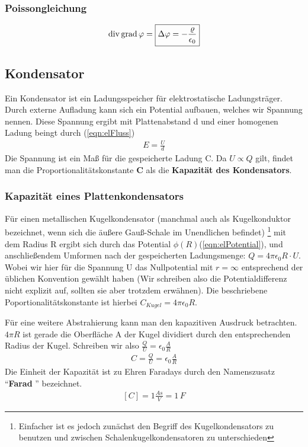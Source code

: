 \subsubsection{Poissongleichung}\begin{align}\label{eqn:Poissongleichung}
\mathrm{div\,} \mathrm{grad\,} \varphi = \boxed{\Delta \varphi = -\frac{\varrho}{\epsilon_0}}
\end{align}
\subsection{Kondensator}
Ein Kondensator ist ein Ladungsspeicher für elektrostatische Ladungsträger.
Durch externe Aufladung kann sich ein Potential aufbauen, welches wir Spannung nennen.
Diese Spannung ergibt mit  Plattenabstand d und einer homogenen Ladung beingt durch (\ref{eqn:elFluss})\begin{align}
E = \frac{U}{d}
\end{align}Die Spannung ist ein Maß für die gespeicherte Ladung C. Da $U \propto Q$ gilt, findet man die Proportionalitätskonstante \textbf{C} als die \textbf{Kapazität des Kondensators}.

\subsubsection{Kapazität eines Plattenkondensators}
Für einen metallischen Kugelkondensator (manchmal auch als Kugelkonduktor bezeichnet, wenn sich die äußere Gauß-Schale im Unendlichen befindet) \footnote{Einfacher ist es jedoch zunächst den Begriff des Kugelkondensators zu benutzen und zwischen Schalenkugelkondensatoren zu unterschieden} mit dem Radius R ergibt sich durch das Potential $\phi \left(R\right)$(\ref{eqn:elPotential}), und anschließendem Umformen nach der gespeicherten Ladungsmenge: $Q = 4\pi \epsilon_0 R \cdot U$. Wobei wir hier für die Spannung U das Nullpotential  mit $r = \infty$ entsprechend der üblichen Konvention gewählt haben (Wir schreiben also die Potentialdifferenz nicht explizit auf, sollten sie aber trotzdem erwähnen).
Die beschriebene Poportionalitätskonstante ist hierbei $C_{Kugel} = 4\pi \epsilon_0 R$. \par
Für eine weitere Abstrahierung kann man den kapazitiven Ausdruck betrachten. $4\pi R$ ist gerade die Oberfläche A der Kugel dividiert durch den entsprechenden Radius der Kugel. Schreiben wir also $\tfrac{Q}{U} = \epsilon_0 \frac{A}{R} $\begin{align} \label{eqn:Kapazität Plattenkondensator}
\boxed{C = \frac{Q}{U} = \epsilon_0 \frac{A}{R}}
\end{align}
Die Einheit der Kapazität ist zu Ehren Faradays durch den Namenszusatz "`\textbf{Farad} "' bezeichnet.\begin{align*}
\left[ C\right] = 1 \frac{As}{V} = 1 \, F
\end{align*}

